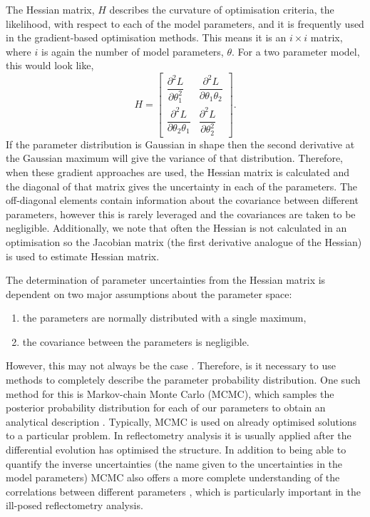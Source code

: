 \documentclass[
 reprint,
 superscriptaddress,
 amsmath,amssymb,
 aps,
]{revtex4-1}
\begin{document}
The Hessian matrix, $H$ describes the curvature of optimisation criteria, the likelihood, with respect to each of the model parameters, and it is frequently used in the gradient-based optimisation methods.
This means it is an $i\times i$ matrix, where $i$ is again the number of model parameters, $\theta$. For a two parameter model, this would look like,
%
\begin{equation}
    H =
    \left[\begin{matrix}
        \dfrac{\partial^2 L}{\partial \theta_{1}^2} & \dfrac{\partial^2 L}{\partial \theta_1 \theta_2} \\[6pt]
        \dfrac{\partial^2 L}{\partial \theta_2 \theta_1} & \dfrac{\partial^2 L}{\partial \theta_{2}^2}
    \end{matrix}\right].
\end{equation}
%
If the parameter distribution is Gaussian in shape then the second derivative at the Gaussian maximum will give the variance of that distribution.
Therefore, when these gradient approaches are used, the Hessian matrix is calculated and the diagonal of that matrix gives the uncertainty in each of the parameters.
The off-diagonal elements contain information about the covariance between different parameters, however this is rarely leveraged and the covariances are taken to be negligible.
Additionally, we note that often the Hessian is not calculated in an optimisation so the Jacobian matrix (the first derivative analogue of the Hessian) is used to estimate Hessian matrix.

The determination of parameter uncertainties from the Hessian matrix is dependent on two major assumptions about the parameter space:
\begin{enumerate}
    \item {the parameters are normally distributed with a single maximum,}
    \item {the covariance between the parameters is negligible.}
\end{enumerate}
However, this may not always be the case \cite{mccluskey_bayesian_2019}. Therefore, is it necessary to use methods to completely describe the parameter probability distribution.
One such method for this is Markov-chain Monte Carlo (MCMC), which samples the posterior probability distribution for each of our parameters to obtain an analytical description \cite{sivia_data_2006}.
Typically, MCMC is used on already optimised solutions to a particular problem. In reflectometry analysis it is usually applied after the differential evolution has optimised the structure.
In addition to being able to quantify the inverse uncertainties (the name given to the uncertainties in the model parameters) MCMC also offers a more complete understanding of the correlations between different parameters \cite{gilks_markov_1995}, which is particularly important in the ill-posed reflectometry analysis.
\end{document}
